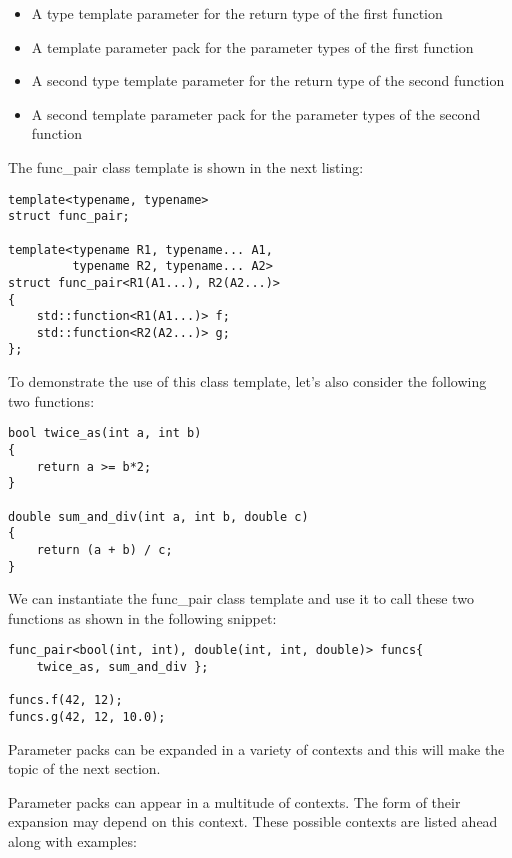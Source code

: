 \begin{itemize}
\item
A type template parameter for the return type of the first function

\item
A template parameter pack for the parameter types of the first function

\item
A second type template parameter for the return type of the second function

\item
A second template parameter pack for the parameter types of the second function
\end{itemize}

The func\_pair class template is shown in the next listing:

\begin{lstlisting}[style=styleCXX]
template<typename, typename>
struct func_pair;

template<typename R1, typename... A1,
         typename R2, typename... A2>
struct func_pair<R1(A1...), R2(A2...)>
{
	std::function<R1(A1...)> f;
	std::function<R2(A2...)> g;
};
\end{lstlisting}

To demonstrate the use of this class template, let's also consider the following two functions:

\begin{lstlisting}[style=styleCXX]
bool twice_as(int a, int b)
{
	return a >= b*2;
}

double sum_and_div(int a, int b, double c)
{
	return (a + b) / c;
}
\end{lstlisting}

We can instantiate the func\_pair class template and use it to call these two functions as shown in the following snippet:

\begin{lstlisting}[style=styleCXX]
func_pair<bool(int, int), double(int, int, double)> funcs{
	twice_as, sum_and_div };

funcs.f(42, 12);
funcs.g(42, 12, 10.0);
\end{lstlisting}

Parameter packs can be expanded in a variety of contexts and this will make the topic of the next section.


Parameter packs can appear in a multitude of contexts. The form of their expansion may depend on this context. These possible contexts are listed ahead along with examples:

